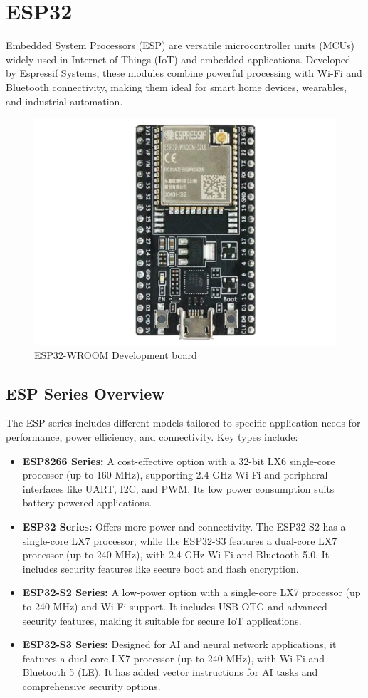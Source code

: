 \section{ESP32}

Embedded System Processors (ESP) are versatile microcontroller units (MCUs) widely used in Internet of Things (IoT) and embedded applications. Developed by Espressif Systems, these modules combine powerful processing with Wi-Fi and Bluetooth connectivity, making them ideal for smart home devices, wearables, and industrial automation.

\begin{figure}[h!]
	\centering
	\includegraphics[width=0.4\linewidth]{assets/ch2/esp32}
	\caption{ESP32-WROOM Development board}
	\label{fig:esp32}
\end{figure}

\subsection{ESP Series Overview}

The ESP series includes different models tailored to specific application needs for performance, power efficiency, and connectivity. Key types include:

\begin{itemize}
	\item \textbf{ESP8266 Series:} A cost-effective option with a 32-bit LX6 single-core processor (up to 160 MHz), supporting 2.4 GHz Wi-Fi and peripheral interfaces like UART, I2C, and PWM. Its low power consumption suits battery-powered applications.
	
	\item \textbf{ESP32 Series:} Offers more power and connectivity. The ESP32-S2 has a single-core LX7 processor, while the ESP32-S3 features a dual-core LX7 processor (up to 240 MHz), with 2.4 GHz Wi-Fi and Bluetooth 5.0. It includes security features like secure boot and flash encryption.
	
	\item \textbf{ESP32-S2 Series:} A low-power option with a single-core LX7 processor (up to 240 MHz) and Wi-Fi support. It includes USB OTG and advanced security features, making it suitable for secure IoT applications.
	
	\item \textbf{ESP32-S3 Series:} Designed for AI and neural network applications, it features a dual-core LX7 processor (up to 240 MHz), with Wi-Fi and Bluetooth 5 (LE). It has added vector instructions for AI tasks and comprehensive security options.
\end{itemize}

